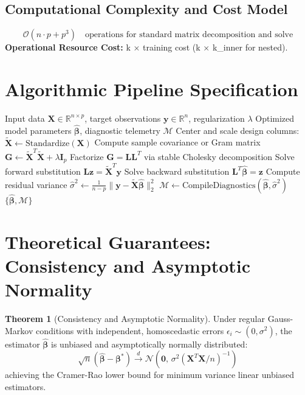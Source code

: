 \documentclass[11pt,a4paper]{article}
\theoremstyle{definition}
\newtheorem{theorem}{\textbf{Theorem}}[section]
\begin{document}
\subsection{Computational Complexity and Cost Model}
\begin{equation}
\mathcal{O}(n \cdot p + p^3) \quad \text{operations for standard matrix decomposition and solve}
\end{equation}
\textbf{Operational Resource Cost:} k × training cost (k × k\_inner for nested).

\section{Algorithmic Pipeline Specification}

\begin{algorithm}[H]
\caption{Cross-validation Execution}
\begin{algorithmic}[1]
\Require Input data $\mathbf{X} \in \mathbb{R}^{n \times p}$, target observations $\mathbf{y} \in \mathbb{R}^n$, regularization $\lambda$
\Ensure Optimized model parameters $\hat{\boldsymbol{\beta}}$, diagnostic telemetry $\mathcal{M}$
\State Center and scale design columns: $\tilde{\mathbf{X}} \gets \text{Standardize}(\mathbf{X})$
\State Compute sample covariance or Gram matrix $\mathbf{G} \gets \tilde{\mathbf{X}}^T \tilde{\mathbf{X}} + \lambda \mathbf{I}_p$
\State Factorize $\mathbf{G} = \mathbf{L} \mathbf{L}^T$ via stable Cholesky decomposition
\State Solve forward substitution $\mathbf{L} \mathbf{z} = \tilde{\mathbf{X}}^T \mathbf{y}$
\State Solve backward substitution $\mathbf{L}^T \hat{\boldsymbol{\beta}} = \mathbf{z}$
\State Compute residual variance $\hat{\sigma}^2 \gets \frac{1}{n - p} \| \mathbf{y} - \tilde{\mathbf{X}} \hat{\boldsymbol{\beta}} \|_2^2$
\State $\mathcal{M} \gets \text{CompileDiagnostics}(\hat{\boldsymbol{\beta}}, \hat{\sigma}^2)$
\State \Return $\{\hat{\boldsymbol{\beta}}, \mathcal{M}\}$
\end{algorithmic}
\end{algorithm}

\section{Theoretical Guarantees: Consistency and Asymptotic Normality}

\begin{theorem}[Consistency and Asymptotic Normality]
Under regular Gauss-Markov conditions with independent, homoscedastic errors $\epsilon_i \sim (0, \sigma^2)$, the estimator $\hat{\boldsymbol{\beta}}$ is unbiased and asymptotically normally distributed:
\begin{equation}
\sqrt{n}(\hat{\boldsymbol{\beta}} - \boldsymbol{\beta}^*) \xrightarrow{d} \mathcal{N}\left(\mathbf{0}, \, \sigma^2 (\mathbf{X}^T \mathbf{X} / n)^{-1}\right)
\end{equation}
achieving the Cramer-Rao lower bound for minimum variance linear unbiased estimators.
\end{theorem}
\end{document}
